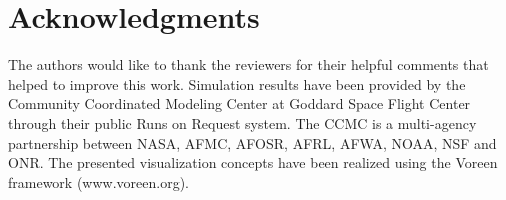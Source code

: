 \documentclass[journal]{vgtc}                %
\begin{document}
\section*{Acknowledgments}
The authors would like to thank the reviewers for their helpful comments that helped to improve this work. Simulation results have been provided by the Community Coordinated Modeling Center at Goddard Space Flight Center through their public Runs on Request system. The CCMC is a multi-agency partnership between NASA, AFMC, AFOSR, AFRL, AFWA, NOAA, NSF and ONR. The presented visualization concepts have been realized using the Voreen framework (www.voreen.org).



\end{document}
